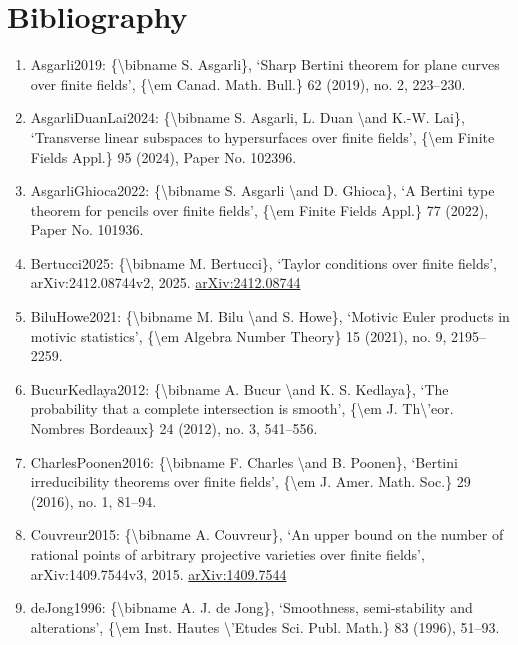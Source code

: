 \documentclass[11pt]{article}
\begin{document}
\section*{Bibliography}
\begin{enumerate}[leftmargin=*]
  \item Asgarli2019: \{\textbackslash{}bibname S. Asgarli\}, `Sharp Bertini theorem for plane curves over finite fields', \{\textbackslash{}em Canad. Math. Bull.\} 62 (2019), no. 2, 223--230.
  \item AsgarliDuanLai2024: \{\textbackslash{}bibname S. Asgarli, L. Duan \textbackslash{}and K.-W. Lai\}, `Transverse linear subspaces to hypersurfaces over finite fields', \{\textbackslash{}em Finite Fields Appl.\} 95 (2024), Paper No. 102396.
  \item AsgarliGhioca2022: \{\textbackslash{}bibname S. Asgarli \textbackslash{}and D. Ghioca\}, `A Bertini type theorem for pencils over finite fields', \{\textbackslash{}em Finite Fields Appl.\} 77 (2022), Paper No. 101936.
  \item Bertucci2025: \{\textbackslash{}bibname M. Bertucci\}, `Taylor conditions over finite fields', arXiv:2412.08744v2, 2025. \href{https://arxiv.org/abs/2412.08744}{arXiv:2412.08744}
  \item BiluHowe2021: \{\textbackslash{}bibname M. Bilu \textbackslash{}and S. Howe\}, `Motivic Euler products in motivic statistics', \{\textbackslash{}em Algebra Number Theory\} 15 (2021), no. 9, 2195--2259.
  \item BucurKedlaya2012: \{\textbackslash{}bibname A. Bucur \textbackslash{}and K. S. Kedlaya\}, `The probability that a complete intersection is smooth', \{\textbackslash{}em J. Th\textbackslash{}'eor. Nombres Bordeaux\} 24 (2012), no. 3, 541--556.
  \item CharlesPoonen2016: \{\textbackslash{}bibname F. Charles \textbackslash{}and B. Poonen\}, `Bertini irreducibility theorems over finite fields', \{\textbackslash{}em J. Amer. Math. Soc.\} 29 (2016), no. 1, 81--94.
  \item Couvreur2015: \{\textbackslash{}bibname A. Couvreur\}, `An upper bound on the number of rational points of arbitrary projective varieties over finite fields', arXiv:1409.7544v3, 2015. \href{https://arxiv.org/abs/1409.7544}{arXiv:1409.7544}
  \item deJong1996: \{\textbackslash{}bibname A. J. de Jong\}, `Smoothness, semi-stability and alterations', \{\textbackslash{}em Inst. Hautes \textbackslash{}'Etudes Sci. Publ. Math.\} 83 (1996), 51--93.

\end{enumerate}
\end{document}
